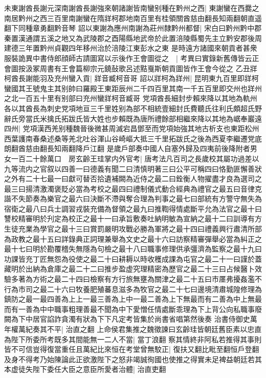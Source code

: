 未東謝酋長謝元深南謝酋長謝強來朝諸謝皆南蠻别種在黔州之西|{
	東謝蠻在西爨之南居黔州之西三百里南謝蠻在隋牂柯郡地南百里有桂領關酋慈由翻長知兩翻朝直遥翻下同種章勇翻黔音琴}
詔以東謝為應州南謝為莊州隸黔州都督|{
	宋白曰黔州黔中郡秦置漢通謂五溪之地又為武陵郡之酉陽縣地武帝於此置涪陵縣蜀先主立黔安郡後周建德三年置黔州貞觀四年移州治於涪陵江東彭水之東}
是時遠方諸國來朝貢者甚衆服裝詭異中書侍郎顔師古請圖寫以示後作王會圖從之　|{
	考異曰實錄新舊傳皆云正會圖按汲冢周書有王會篇柳宗元鐃鼔歌呂述黠戛斯朝貢圖皆作王會今從之}
乙丑牂柯酋長謝能羽及充州蠻入貢|{
	牂音臧柯音哥}
詔以牂柯為牂州|{
	昆明東九百里即牂柯蠻國其王號鬼主其别帥曰羅殿王東距辰州二千四百里其南一千五百里即交州也牂州之北一百五十里有别部曰充州蠻牂柯音臧哥}
党項酋長細封步賴來降以其地為軌州各以其酋長為刺史党項地亘三千里姓别為部不相統壹細封氏費聽氏往利氏頗超氏野辭氏旁當氏米擒氏拓跋氏皆大姓也步賴既為唐所禮餘部相繼來降以其地為崌奉巖遠四州|{
	党項漢西羌别種魏晉後微甚周滅宕昌鄧至而党項始強其地古析支也東距松州西葉護南春桑述桑等羌北吐谷渾山谷崎嶇大抵三千里拓跋氏之後為西夏李繼遷党底朗翻酋慈由翻長知兩翻降戶江翻}
是歲戶部奏中國人自塞外歸及四夷前後降附者男女一百二十餘萬口　房玄齡王珪掌内外官考|{
	唐考法凡百司之長歲校其屬功過差以九等流内之官叙以四善一曰德義有聞二曰清慎明著三曰公平可稱四曰恪勤匪懈善狀之外有二十七最一曰獻可替否拾遺補闕為近侍之最二曰銓衡人物擢盡才良為選司之最三曰揚清激濁褒貶必當為考校之最四曰禮制儀式動合經典為禮官之最五曰音律克諧不失節奏為樂官之最六曰決斷不滯與奪合理為判事之最七曰部統有方警守無失為宿衛之最八曰兵士調習戎裝充備為督領之最九曰推鞫得情處斷平允為法官之最十曰讐校精審明於刋定為校正之最十一曰承旨敷奏吐納明敏為宣納之最十二曰訓導有方生徒充業為學官之最十三曰賞罰嚴明攻戰必勝為軍將之最十四曰禮義興行肅清所部為政教之最十五曰詳錄典正詞理兼舉為文史之最十六曰訪察精審彈舉必當為糾正之最十七曰明於勘覆稽失無隱為句檢之最十八曰職事修理供承彊濟為監察之最十九曰功課皆充丁匠無怨為役使之最二十曰耕耨以時收穫成課為屯官之最二十一曰謹於蓋藏明於出納為倉庫之最二十二曰推步盈虚究理精密為歷官之最二十三曰占候醫卜效驗多著為方術之最二十四曰檢察有方行旅無壅為關津之最二十五曰市㕓弗擾姦濫不行為市司之最二十六曰牧養肥殖蕃息滋多為牧官之最二十七曰邊境清肅城隍修理為鎮防之最一最四善為上上一最三善為上中一最二善為上下無最而有二善為中上無最而有一善為中中職事粗理善最不聞為中下愛憎任情處斷乖理為下上背公向私職事廢闕為下中居官諂詐貪濁有狀為下下凡定考皆集於尚書省唱第然後奏}
治書侍御史萬年權萬紀奏其不平|{
	治直之翻}
上命侯君集推之魏徵諫曰玄齡珪皆朝廷舊臣素以忠直為陛下所委所考既多其間能無一二人不當|{
	當丁浪翻}
察其情終非阿私若推得其事則皆不可信豈得復當重任且萬紀比來恒在考堂曾無駮正|{
	復扶又翻比毗至翻恒戶登翻}
及身不得考乃始陳論此正欲激陛下之怒非竭誠徇國也使推之得實未足裨益朝廷若其本虚徒失陛下委任大臣之意臣所愛者治體|{
	治直吏翻}
